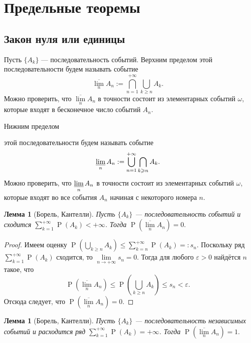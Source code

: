 \documentclass[12pt]{article}
\newtheorem{lemma}[theorem]{Лемма}
\numberwithin{theorem}{section}
\theoremstyle{definition}
\newcommand{\defin}[2]{\hypertarget{#2}{{\color{red} #1}}}
\newcommand{\prob}{\operatorname{P}}
\begin{document}
	
	
	\section{Предельные теоремы}
	
	\subsection{Закон нуля или единицы}
	
	Пусть $ \{A_k\} $ --- последовательность событий.
	\defin{Верхним пределом}{suplim} этой последовательности будем называть событие
	$$ \overline{\lim\limits_{n}} A_n := \bigcap\limits_{n = 1}^{+\infty} \bigcup\limits_{k \geqslant n} A_k. $$
	Можно проверить, что $ \overline{\lim\limits_{n}} A_n $ в точности состоит из элементарных событий $ \omega $,
	которые входят в бесконечное число событий $ A_n $.
	
	\defin{Нижним пределом}{inflim} этой последовательности будем называть событие
	$$ \varliminf\limits_{n} A_n := \bigcup\limits_{n = 1}^{+\infty} \bigcap\limits_{k \geqslant n} A_k. $$
	Можно проверить, что $ \varliminf\limits_{n} A_n $ в точности состоит из элементарных событий $ \omega $,
	которые входят во все события $ A_n $ начиная с некоторого номера $ n $.
	
	\begin{lemma}[Борель, Кантелли]
		Пусть $ \{A_k\} $ --- последовательность событий
		и сходится $ \sum\limits_{k = 1}^{+\infty}\prob (A_k) < +\infty $.
		Тогда $ \prob(\overline{\lim\limits_{n}} A_n) = 0. $
	\end{lemma}
	
	\begin{proof}
		Имеем оценку $ \prob(\bigcup\limits_{k \geqslant n} A_k) \leqslant \sum\limits_{k = n}^{+\infty}\prob (A_k) =: s_n $.
		Поскольку ряд $ \sum\limits_{k = 1}^{+\infty}\prob (A_k) $ сходится, то $ \lim\limits_{n \to +\infty} s_n = 0 $.
		Тогда для любого $ \varepsilon > 0 $ найдётся $ n $ такое, что 
		$$ \prob(\overline{\lim\limits_{n}} A_n)
		\leqslant \prob(\bigcup\limits_{k \geqslant n} A_k) \leqslant s_n < \varepsilon. $$
		Отсюда следует, что $ \prob(\overline{\lim\limits_{n}} A_n) = 0 $.
	\end{proof}
	
	\begin{lemma}[Борель, Кантелли]
		Пусть $ \{A_k\} $ --- последовательность независимых событий
		и расходится ряд $ \sum\limits_{k = 1}^{+\infty}\prob (A_k) = +\infty $.
		Тогда $ \prob(\overline{\lim\limits_{n}} A_n) = 1. $
	\end{lemma}
	
\end{document}
